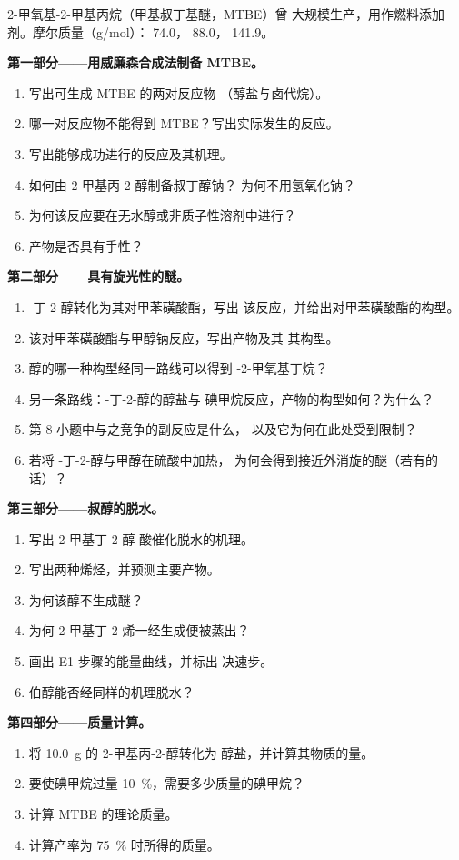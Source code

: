\begin{problem}
\label{pb:b1:alcohol-activation:1}
2-甲氧基-2-甲基丙烷（甲基叔丁基醚，MTBE）曾
大规模生产，用作燃料添加剂。摩尔质量（\unit{g/mol}）：
74.0， 88.0， 141.9。

\medskip
\noindent\textbf{第一部分——用威廉森合成法制备 MTBE。}
\begin{enumerate}
  \item 写出可生成 MTBE 的两对反应物
        （醇盐与卤代烷）。
  \item 哪一对反应物不能得到 MTBE？写出实际发生的反应。
  \item 写出能够成功进行的反应及其机理。
  \item 如何由 2-甲基丙-2-醇制备叔丁醇钠？
        为何不用氢氧化钠？
  \item 为何该反应要在无水醇或非质子性溶剂中进行？
  \item 产物是否具有手性？
\end{enumerate}

\medskip
\noindent\textbf{第二部分——具有旋光性的醚。}
\begin{enumerate}[resume]
  \item {}-丁-2-醇转化为其对甲苯磺酸酯，写出
        该反应，并给出对甲苯磺酸酯的构型。
  \item 该对甲苯磺酸酯与甲醇钠反应，写出产物及其
        其构型。
  \item 醇的哪一种构型经同一路线可以得到
        -2-甲氧基丁烷？
  \item 另一条路线：-丁-2-醇的醇盐与
        碘甲烷反应，产物的构型如何？为什么？
  \item 第 8 小题中与之竞争的副反应是什么，
        以及它为何在此处受到限制？
  \item 若将 -丁-2-醇与甲醇在硫酸中加热，
        为何会得到接近外消旋的醚（若有的话）？
\end{enumerate}

\medskip
\noindent\textbf{第三部分——叔醇的脱水。}
\begin{enumerate}[resume]
  \item 写出 2-甲基丁-2-醇
        酸催化脱水的机理。
  \item 写出两种烯烃，并预测主要产物。
  \item 为何该醇不生成醚？
  \item 为何 2-甲基丁-2-烯一经生成便被蒸出？
  \item 画出 E1 步骤的能量曲线，并标出
        决速步。
  \item 伯醇能否经同样的机理脱水？
\end{enumerate}

\medskip
\noindent\textbf{第四部分——质量计算。}
\begin{enumerate}[resume]
  \item 将 \qty{10.0}{g} 的 2-甲基丙-2-醇转化为
        醇盐，并计算其物质的量。
  \item 要使碘甲烷过量 \qty{10}{\percent}，需要多少质量的碘甲烷？
  \item 计算 MTBE 的理论质量。
  \item 计算产率为 \qty{75}{\percent} 时所得的质量。
\end{enumerate}
\end{problem}
